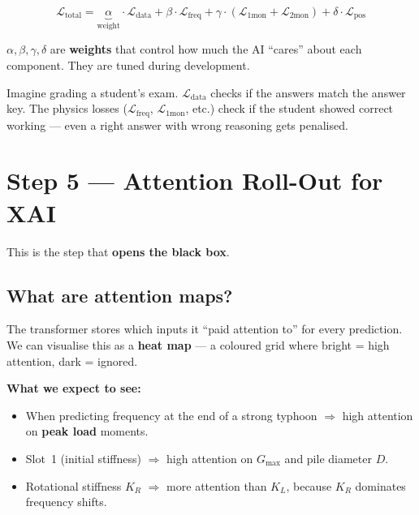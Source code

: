 \documentclass[11pt,a4paper]{article}
\begin{document}
\[
  \mathcal{L}_{\text{total}}
  = \underbrace{\alpha}_{\text{weight}} \cdot \mathcal{L}_{\text{data}}
  + \beta \cdot \mathcal{L}_{\text{freq}}
  + \gamma \cdot (\mathcal{L}_{\text{1mon}} + \mathcal{L}_{\text{2mon}})
  + \delta \cdot \mathcal{L}_{\text{pos}}
\]

$\alpha, \beta, \gamma, \delta$ are \textbf{weights} that control how much
the AI ``cares'' about each component.  They are tuned during development.

\begin{tcolorbox}[colback=yellow!5, colframe=yellow!50!black, title=Analogy]
Imagine grading a student's exam.  $\mathcal{L}_{\text{data}}$ checks if the
answers match the answer key.  The physics losses ($\mathcal{L}_{\text{freq}}$,
$\mathcal{L}_{\text{1mon}}$, etc.) check if the student showed correct working
--- even a right answer with wrong reasoning gets penalised.
\end{tcolorbox}

\section{Step 5 --- Attention Roll-Out for XAI}
\label{sec:xai}

This is the step that \textbf{opens the black box}.

\subsection{What are attention maps?}

The transformer stores which inputs it ``paid attention to'' for every
prediction.  We can visualise this as a \textbf{heat map} --- a coloured grid
where bright = high attention, dark = ignored.

\textbf{What we expect to see:}
\begin{itemize}[noitemsep]
  \item When predicting frequency at the end of a strong typhoon $\Rightarrow$
        high attention on \textbf{peak load} moments.
  \item Slot~1 (initial stiffness) $\Rightarrow$ high attention on
        $G_{\max}$ and pile diameter $D$.
  \item Rotational stiffness $K_R$ $\Rightarrow$ more attention than $K_L$,
        because $K_R$ dominates frequency shifts.
\end{itemize}
\end{document}
